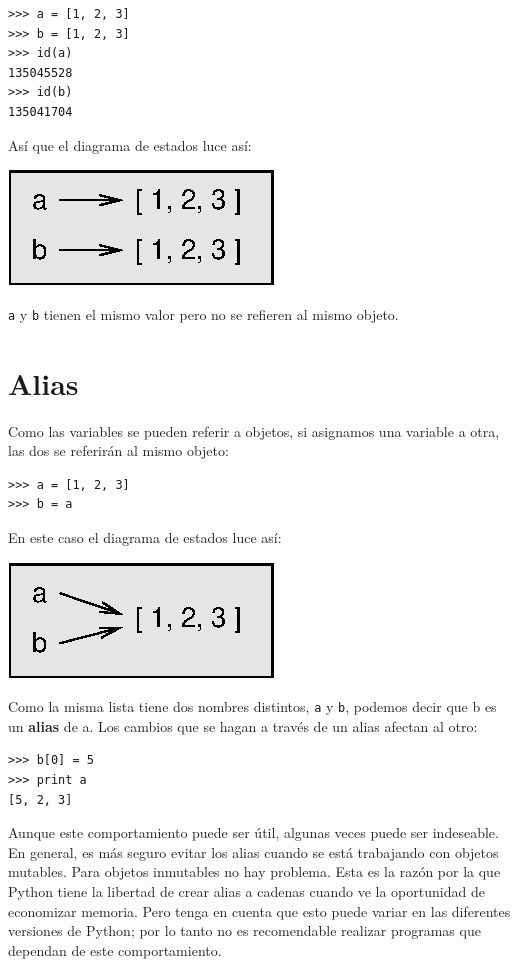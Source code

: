 \beforeverb
\begin{verbatim}
>>> a = [1, 2, 3]
>>> b = [1, 2, 3]
>>> id(a)
135045528
>>> id(b)
135041704
\end{verbatim}
\afterverb
%

Así que el diagrama de estados luce así:

\beforefig
\centerline{\includegraphics{illustrations/list2.eps}}
\afterfig

\texttt{a} y \texttt{b} tienen el mismo valor pero no se
refieren al mismo objeto.


\section{Alias}

Como las variables se pueden referir a objetos, si asignamos
una variable a otra, las dos se referirán al mismo objeto:

\beforeverb
\begin{verbatim}
>>> a = [1, 2, 3]
>>> b = a
\end{verbatim}
\afterverb
%
En este caso el diagrama de estados luce así:

\beforefig
\centerline{\includegraphics{illustrations/list3.eps}}
\afterfig

Como la misma lista tiene dos nombres distintos, \texttt{a} y \texttt{b}, 
podemos decir que b es un {\bf alias} de a. Los cambios que se 
hagan a través de un alias afectan al otro:

\beforeverb
\begin{verbatim}
>>> b[0] = 5
>>> print a
[5, 2, 3]
\end{verbatim}
\afterverb
%
Aunque este comportamiento puede ser útil, algunas veces puede
ser indeseable. En general, es más seguro evitar los alias 
cuando se está trabajando con objetos mutables. Para objetos
inmutables no hay problema. Esta es la razón por la que
Python tiene la libertad de crear alias a cadenas cuando ve
la oportunidad de economizar memoria. Pero tenga en cuenta que esto 
puede variar en las diferentes versiones de Python; por lo tanto no es
recomendable realizar programas que dependan de este comportamiento.



